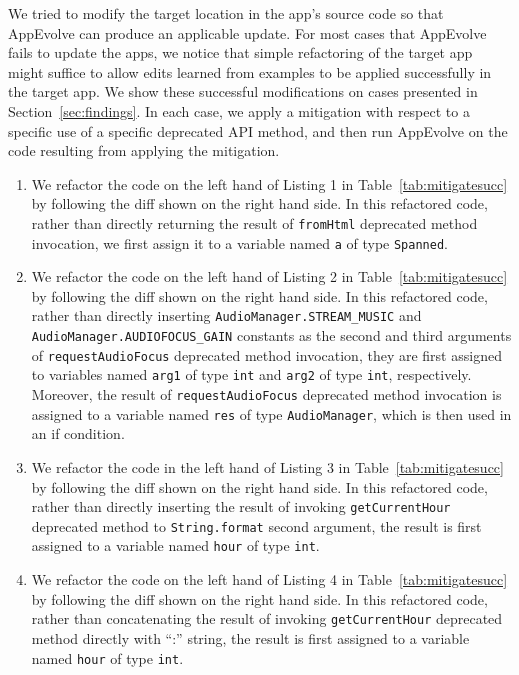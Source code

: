 We tried to modify the target location in the app's source code so that
AppEvolve can produce an applicable update. For most cases that AppEvolve
fails to update the apps, we notice that simple refactoring of the target
app might suffice to allow edits learned from examples to be applied
successfully in the target app. We show these successful modifications on
cases presented in Section~\ref{sec:findings}. In each case, we apply a
mitigation with respect to a specific use of a specific deprecated API
method, and then run AppEvolve on the code resulting from applying the
mitigation.

\begin{enumerate}
\item We refactor the code on the left hand of Listing 1 in Table~\ref{tab:mitigatesucc} by following the diff shown on the right hand side. In this refactored code, rather than directly returning the result of {\tt fromHtml} deprecated method invocation, we first assign it to a variable named {\tt a} of type {\tt Spanned}. %

\item We refactor the code on the left hand of Listing 2 in Table~\ref{tab:mitigatesucc} by following the diff shown on the right hand side. In this refactored code, rather than directly inserting {\tt AudioManager.STREAM\_MUSIC} and {\tt AudioManager.AUDIOFOCUS\_GAIN} constants as the second and third arguments of {\tt requestAudioFocus} deprecated method invocation, they are first assigned to variables named {\tt arg1} of type {\tt int} and {\tt arg2} of type {\tt int}, respectively. Moreover, the result of {\tt requestAudioFocus} deprecated method invocation is assigned to a variable  named {\tt res} of type {\tt AudioManager}, which is then used in an if condition.

\item We refactor the code in the left hand of Listing 3 in  Table~\ref{tab:mitigatesucc} by following the diff shown on the right hand side. In this refactored code, rather than directly inserting the result of invoking {\tt getCurrentHour} deprecated method to {\tt String.format} second argument, the result is first assigned to a variable named {\tt hour} of type {\tt int}.

\item We refactor the code on the left hand of Listing 4 in  Table~\ref{tab:mitigatesucc} by following the diff shown on the right hand side. In this refactored code, rather than concatenating the result of invoking {\tt getCurrentHour} deprecated method directly with ``:'' string, the result is first assigned to a variable named {\tt hour} of type {\tt int}.


\end{enumerate}
